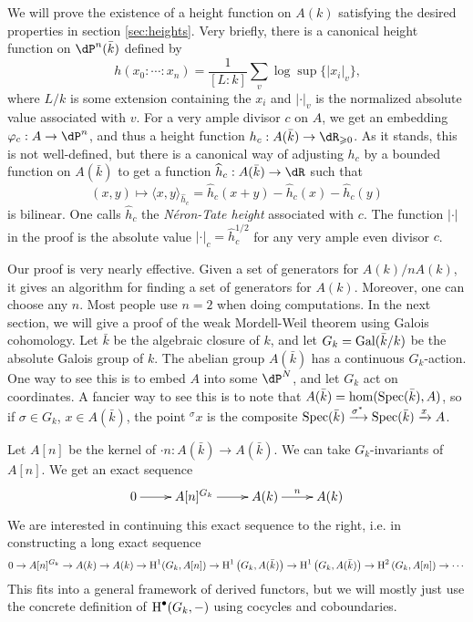 \documentclass{article}
\begin{document}
We will prove the existence of a height function on $A(k)$ satisfying the 
desired properties in section \ref{sec:heights}. Very briefly, there is a 
canonical height function on $\dP^n(\bar k)$ defined by  
\[
  h(x_0:\cdots:x_n) = \frac{1}{[L:k]} \sum_v \log \sup\{|x_i|_v\} \text{,}
\]
where $L/k$ is some extension containing the $x_i$ and $|\cdot|_v$ is the 
normalized absolute value associated with $v$. For a very ample divisor $c$ on 
$A$, we get an embedding $\varphi_c:A\to \dP^n$, and thus a height function 
$h_c:A(\bar k)\to \dR_{\geqslant 0}$. As it stands, this is not well-defined, 
but there is a canonical way of adjusting $h_c$ by a bounded function on 
$A(\bar k)$ to get a function $\widehat h_c:A(\bar k)\to \dR$ such that 
\[
  (x,y)\mapsto \langle x,y\rangle_{\widehat h_c} = \widehat h_c(x+y) - \widehat h_c(x) - \widehat h_c(y)
\]
is bilinear. One calls $\widehat h_c$ the \emph{N\'eron-Tate height} associated 
with $c$. The function $|\cdot|$ in the proof is the absolute value 
$|\cdot|_c=\widehat h_c^{1/2}$ for any very ample even divisor $c$.





Our proof is very nearly effective. Given a set of generators for 
$A(k)/n A(k)$, it gives an algorithm for finding a set of generators for 
$A(k)$. Moreover, one can choose any $n$. Most people use $n = 2$ when doing 
computations. In the next section, we will give a proof of the weak 
Mordell-Weil theorem using Galois cohomology. Let $\bar k$ be the algebraic 
closure of $k$, and let  $G_k = \operatorname{Gal}(\bar k/k)$ be the absolute Galois group of 
$k$. The abelian group $A(\bar k)$ has a continuous $G_k$-action. One way to 
see this is to embed $A$ into some $\dP^N$, and let $G_k$ act on 
coordinates. A fancier way to see this is to note that 
$A(\bar k) = \hom(\operatorname{Spec}(\bar k),A)$, so if $\sigma\in G_k$, $x\in A(\bar k)$, 
the point $^\sigma x$ is the composite 
$\operatorname{Spec}(\bar k)\xrightarrow{\sigma^*} \operatorname{Spec}(\bar k) \xrightarrow{x} A$. 

Let $A[n]$ be the kernel of $\cdot n : A(\bar k)\to A(\bar k)$. We can take 
$G_k$-invariants of $A[n]$. We get an exact sequence 
\[\xymatrix{
  0 \ar[r] 
    & A[n]^{G_k} \ar[r] 
    & A(k) \ar[r]^-n 
    & A(k)
}\]
We are interested in continuing this exact sequence to the right, i.e. in 
constructing a long exact sequence 
\[
  0 \to A[n]^{G_k} \to A(k) \to A(k) \to \operatorname{H}^1(G_k,A[n]) \to \operatorname{H}^1\left(G_k,A(\bar k)\right)\to \operatorname{H}^1\left(G_k, A(\bar k)\right) \to \operatorname{H}^2\left(G_k, A[n]\right) \to \cdots
\]
This fits into a general framework of derived functors, but we will mostly 
just use the concrete definition of $\operatorname{H}^\bullet(G_k,-)$ using cocycles and 
coboundaries. 
\end{document}
